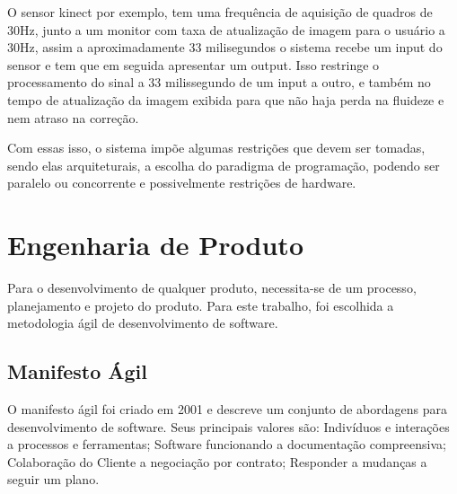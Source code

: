   O sensor kinect \cite{microsoftResearch} por exemplo, tem uma frequência de 
aquisição de quadros de 30Hz, junto a um monitor com taxa de atualização de imagem  
para o usuário a 30Hz, assim a aproximadamente 33 milisegundos o 
sistema recebe um input do sensor e tem que em seguida apresentar um output. Isso
 restringe o processamento do sinal a 33 milissegundo de um input a outro, e 
também no tempo de atualização da imagem exibida para que não haja perda na 
fluideze e nem atraso na correção.

  Com essas isso, o sistema impõe algumas restrições que devem ser tomadas,
sendo elas arquiteturais, a escolha do  paradigma de programação, podendo ser paralelo ou 
concorrente e possivelmente restrições de hardware.


\section{Engenharia de Produto}
\label{Sec:Engenharia de Produto}
  Para o desenvolvimento de qualquer produto, necessita-se de um processo, 
planejamento e projeto do produto. Para este trabalho, foi escolhida a 
metodologia ágil de desenvolvimento de software.
\subsection{Manifesto Ágil}
\label{Sec:Manifesto Ágil}
  O manifesto ágil foi criado em 2001 e descreve um conjunto de abordagens para
desenvolvimento de software.
  Seus principais valores são:
  Indivíduos e interações a processos e ferramentas;
  Software funcionando a documentação compreensiva;
  Colaboração do Cliente a negociação por contrato;
  Responder a mudanças a seguir um plano.\cite{manifestoAgil}


